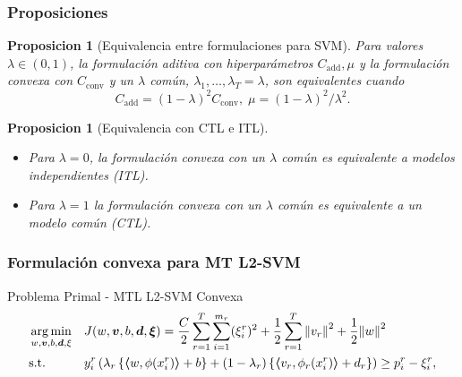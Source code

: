 \documentclass{beamer}
\newtheorem{proposition}[theorem]{Proposicion}
\DeclareMathOperator*{\argmin}{arg\min}
\newcommand{\norm}[1]{\left\lVert#1\right\rVert}
\newcommand{\myvec}[1]{\bm{#1}}
\newcommand{\fv}[1]{\myvec{#1}}
\newcommand{\dotp}[2]{\bm{\left\langle} #1, #2 \bm{\right\rangle}}
\newcommand{\ntasks}{T}
\begin{document}
\begin{frame}
      \frametitle{Proposiciones}

      \begin{proposition}[Equivalencia entre formulaciones para SVM]
            Para valores $\lambda \in (0, 1)$, la formulación aditiva con hiperparámetros $C_\text{add}, \mu$ y la formulación convexa con $C_\text{conv}$ y un $\lambda$ común, $\lambda_1, \ldots, \lambda_\ntasks = \lambda$, son equivalentes cuando
            $$C_\text{add} = (1 - \lambda)^2 C_\text{conv}, \; \mu = (1 - \lambda)^2 / \lambda^2 .$$ 
      \end{proposition}

      \begin{proposition}[Equivalencia con CTL e ITL]
            \begin{itemize}
                  \item Para $\lambda = 0$, la formulación convexa con un $\lambda$ común es equivalente a modelos independientes (ITL).
                  \item Para $\lambda = 1$ la formulación convexa con un $\lambda$ común es equivalente a un modelo común (CTL).
            \end{itemize}
      \end{proposition}

\end{frame}


\begin{frame}
      \frametitle{Formulación convexa para MT L2-SVM}

      \begin{block}{Problema Primal - MTL L2-SVM Convexa}
            \begin{equation}\nonumber
                  \begin{aligned}
                  & \argmin_{w, \fv{v}, b, \fv{d}, \xi}
                  & & {J({w}, \fv{v}, b, \fv{d}, \fv{\xi}) = \frac{C}{2} \sum_{r= 1}^T \sum_{i=1}^{m_r} ({\xi_{i}^r})^2 + \frac{1}{2} \sum_{r= 1}^T{\norm{{v}_r}^2} + \frac{1}{2} {\norm{{w}}}^2} \\
                  & \text{s.t.}
                  & & y_{i}^r \left(\lambda_r \left\lbrace \dotp{w}{\phi(x_{i}^r)} + b  \right\rbrace + (1 - \lambda_r) \left\lbrace \dotp{{v}_r}{\phi_r(x_{i}^r)} + d_r \right\rbrace  \right) \geq p_{i}^r - \xi_{i}^r ,  \\
                  \end{aligned}
              \end{equation}
      \end{block}

      

\end{frame}
\end{document}
